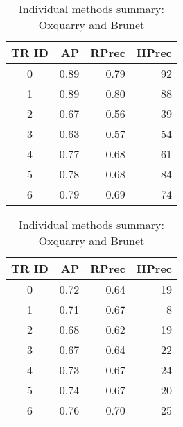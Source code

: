 \onecolumn

\twocolumn

\begin{table}[H]
  \centering
  \caption{Individual methods summary: Oxquarry and Brunet}
  \label{tab:rls_oxquarry_brunet}

  \begin{tabular}{c r r r}
    \toprule
    TR ID & AP & RPrec & HPrec \\
    \midrule
    0 & 0.89 & 0.79 & 92 \\
    1 & 0.89 & 0.80 & 88 \\
    2 & 0.67 & 0.56 & 39 \\
    3 & 0.63 & 0.57 & 54 \\
    4 & 0.77 & 0.68 & 61 \\
    5 & 0.78 & 0.68 & 84 \\
    6 & 0.79 & 0.69 & 74 \\
    \bottomrule
  \end{tabular}

  \vspace{0.5cm}

  \begin{tabular}{c r r r}
    \toprule
    TR ID & AP & RPrec & HPrec \\
    \midrule
    0 & 0.72 & 0.64 & 19 \\
    1 & 0.71 & 0.67 &  8 \\
    2 & 0.68 & 0.62 & 19 \\
    3 & 0.67 & 0.64 & 22 \\
    4 & 0.73 & 0.67 & 24 \\
    5 & 0.74 & 0.67 & 20 \\
    6 & 0.76 & 0.70 & 25 \\
    \bottomrule
  \end{tabular}
\end{table}


